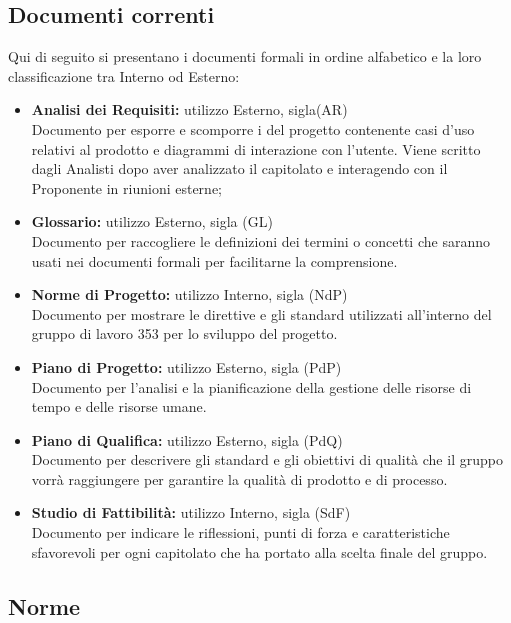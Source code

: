 \documentclass[NormeDiProgetto.tex]{subfiles}
\begin{document}
	\subsection{Documenti correnti}
	Qui di seguito si presentano i documenti formali in ordine alfabetico e la loro classificazione tra Interno od Esterno:
	\begin{itemize}
		\item \textbf{Analisi dei Requisiti:} utilizzo Esterno, sigla(AR) \\
		 Documento per esporre e scomporre i  del progetto contenente casi d'uso relativi al prodotto e diagrammi di interazione con l'utente. Viene scritto dagli Analisti dopo aver analizzato il capitolato e interagendo con il Proponente in riunioni esterne;
		
		\item \textbf{Glossario:}
		utilizzo Esterno, sigla (GL) \\
		Documento per raccogliere le definizioni dei termini o concetti che saranno usati nei documenti formali per facilitarne la comprensione.
		
		\item \textbf{Norme di Progetto:}
		utilizzo Interno, sigla (NdP) \\
		Documento per mostrare le direttive e gli standard utilizzati all'interno del gruppo di lavoro 353
		per lo sviluppo del progetto.
		
		\item \textbf{Piano di Progetto:}
		utilizzo Esterno, sigla (PdP) \\
		Documento per l'analisi e la pianificazione della gestione delle risorse di tempo e delle risorse umane.
		
		\item \textbf{Piano di Qualifica:}
		utilizzo Esterno, sigla (PdQ) \\
		Documento per descrivere gli standard e gli obiettivi di qualità che il gruppo vorrà raggiungere per garantire la qualità di prodotto e di processo.
		
		\item \textbf{Studio di Fattibilità:}
		utilizzo Interno, sigla (SdF) \\
		Documento per indicare le riflessioni, punti di forza e caratteristiche sfavorevoli per ogni capitolato che ha portato alla scelta finale del gruppo.
		
	\end{itemize}
	
	\subsection{Norme}
\end{document}
